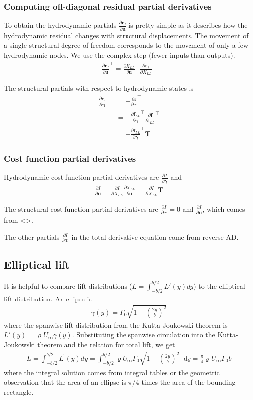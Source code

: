 \documentclass[10pt]{article}
\newcommand{\diff}{\mathop{}\!\tn{d}} %
\newcommand{\pp}[2]{\frac{\partial #1}{\partial #2}}
\newcommand{\mb}[1]{\boldsymbol{\mathbf{#1}}} %
\newcommand{\mbf}[1]{\mathbf{#1}}
\newcommand{\mcal}[1]{\mathcal{#1}} %
\newcommand{\be}{\begin{eqnarray}}
\newcommand{\ee}{\end{eqnarray}}
\newcommand{\beq}{\begin{equation}\begin{aligned}}
\newcommand{\eeq}{\end{aligned}\end{equation}}
\newcommand{\Uinf}{U_{\infty}}
\newcommand{\tn}[1]{\textrm{#1}}
\begin{document}
\subsubsection{Computing off-diagonal residual partial derivatives}

To obtain the hydrodynamic partials $\pp{\mb{r}_f}{\mb{u}}$ is pretty simple as it describes how the hydrodynamic residual changes with structural displacements.
The movement of a single structural degree of freedom corresponds to the movement of only a few hydrodynamic nodes.
We use the complex step (fewer inputs than outputs).
\beq
\pp{\mb{r}_f}{\mb{u}}^\top =
\pp{X_{LL}}{\mb{u}}^\top
\pp{\mb{r}_f}{X_{LL}}^\top
\eeq

The structural partials with respect to hydrodynamic states is
\beq
\pp{\mb{r}_s}{\mb{\gamma}}^\top & = -\pp{\mbf{f}}{\mb{\gamma}}^\top
\\
& = -\pp{\mbf{f}_{LL}}{\mb{\gamma}}^\top \pp{\mb{f}}{\mb{f}_{LL}}^\top 
\\
&=-\pp{\mbf{f}_{LL}}{\mb{\gamma}}^\top \mb{T}
\eeq

\subsubsection{Cost function partial derivatives}

Hydrodynamic cost function partial derivatives are $\pp{I}{\mb{\gamma}}$ and
\beq
\pp{I}{\mb{u}} = \pp{I}{X_{LL}}\pp{X_{LL}}{\mb{u}} = \pp{I}{X_{LL}} \mb{T}
\eeq

The structural cost function partial derivatives are $\pp{I}{\mb{\gamma}}=0$ and $\pp{I}{\mb{u}}$, which comes from <>.

The other partials $\pp{I}{\mcal{X}}$ in the total derivative equation come from reverse AD.
\subsection{Elliptical lift}

It is helpful to compare lift distributions ($L = \int_{-b/2}^{b/2}L'(y) dy$) to the elliptical lift distribution.
An ellipse is
\be
\gamma(y)=\Gamma_0 \sqrt{1-\left(\frac{2 y}{b}\right)^2}
\ee
where the spanwise lift distribution from the Kutta-Joukowski theorem is $L'(y) = \varrho \Uinf \gamma(y)$.
Substituting the spanwise circulation into the Kutta-Joukowski theorem and the relation for total lift, we get
\be
L=\int_{-b / 2}^{b / 2} L^{\prime}(y) d y=\int_{-b / 2}^{b / 2} \varrho \Uinf \Gamma_0 \sqrt{1-\left(\frac{2 y}{b}\right)^2} \diff y=\frac{\pi}{4} \varrho \Uinf \Gamma_0 b
\ee
where the integral solution comes from integral tables or the geometric observation that the area of an ellipse is $\pi/4$ times the area of the bounding rectangle.
\end{document}

